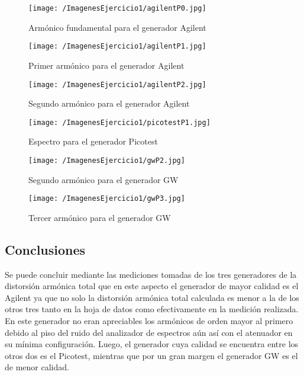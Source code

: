 \begin{figure}[H]
  \centering
  \begin{minipage}[b]{0.4\textwidth}
    \texttt{[image: /ImagenesEjercicio1/agilentP0.jpg]}
    \caption{Armónico fundamental para el generador Agilent}
    \label{fig:ag1}
  \end{minipage}
  \hfill
  \begin{minipage}[b]{0.4\textwidth}
    \texttt{[image: /ImagenesEjercicio1/agilentP1.jpg]}
    \caption{Primer armónico para el generador Agilent}
    \label{fig:ag2}
  \end{minipage}
   \hfill
   \begin{minipage}[b]{0.4\textwidth}
    \texttt{[image: /ImagenesEjercicio1/agilentP2.jpg]}
    \caption{Segundo armónico para el generador Agilent}
    \label{fig:ag3}
  \end{minipage}
\end{figure}

\begin{figure}[H]
	\centering
	\texttt{[image: /ImagenesEjercicio1/picotestP1.jpg]}
\caption{Espectro para el generador Picotest}
	\label{fig:pico1}
\end{figure}

\begin{figure}[H]
  \centering
  \begin{minipage}[b]{0.4\textwidth}
    \texttt{[image: /ImagenesEjercicio1/gwP2.jpg]}
    \caption{Segundo armónico para el generador GW}
    \label{fig:gw0}
  \end{minipage}
  \hfill
  \begin{minipage}[b]{0.4\textwidth}
    \texttt{[image: /ImagenesEjercicio1/gwP3.jpg]}
    \caption{Tercer armónico para el generador GW}
    \label{fig:gw1}
  \end{minipage}
 \end{figure}

\subsection{Conclusiones}
Se puede concluir mediante las mediciones tomadas de los tres generadores de la distorsión armónica total que en este aspecto el generador de mayor calidad es el Agilent ya que no solo la distorsión armónica total calculada es menor a la de los otros tres tanto en la hoja de datos como efectivamente en la medición realizada. En este generador no eran apreciables los armónicos de orden mayor al primero debido al piso del ruido del analizador de espectros aún así con el atenuador en su mínima configuración. Luego, el generador cuya calidad se encuentra entre los otros dos es el Picotest, mientras que por un gran margen el generador GW es el de menor calidad.    
